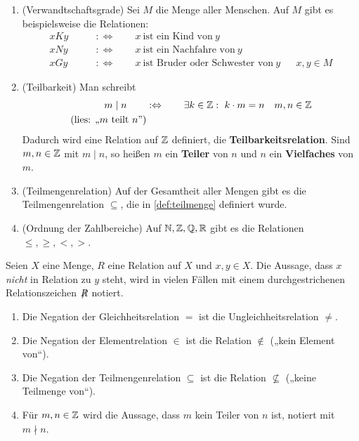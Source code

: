 \begin{bsp} \label{bsp:relation}   \quad
    \begin{enumerate}
        \item(Verwandtschaftsgrade) Sei $M$ die Menge aller Menschen. Auf $M$ gibt es beispielsweise die Relationen:
        \begin{align*}
            xKy \qquad&:\Leftrightarrow\qquad x\ \text{ist ein Kind von}\ y && \\
            xNy \qquad&:\Leftrightarrow\qquad x\ \text{ist ein Nachfahre von}\ y && \\
            xGy \qquad&:\Leftrightarrow\qquad x\ \text{ist Bruder oder Schwester von}\ y && x,y\in M
        \end{align*}
        \item(Teilbarkeit) Man schreibt
        \begin{align*}
            m \mid n \qquad& :\Leftrightarrow\qquad \exists k\in \mathbb Z:\ k\cdot m=n && m,n\in \mathbb Z \\
            (\text{lies: „$m$ teilt $n$”})
        \end{align*}
        Dadurch wird eine Relation auf $\mathbb Z$ definiert, die \textbf{Teilbarkeitsrelation}. Sind $m,n\in \mathbb Z$ mit $m\mid n$, so heißen $m$ ein \textbf{Teiler} von $n$ und $n$ ein \textbf{Vielfaches} von $m$.
        \item(Teilmengenrelation) Auf der Gesamtheit aller Mengen gibt es die Teilmengenrelation $\subseteq$, die in \cref{def:teilmenge} definiert wurde.
        \item(Ordnung der Zahlbereiche) Auf $\mathbb N,\mathbb Z,\mathbb Q,\mathbb R$ gibt es die Relationen $\le, \ge, <, >$.
    \end{enumerate}
\end{bsp}


\begin{nota}
    Seien $X$ eine Menge, $R$ eine Relation auf $X$ und $x,y\in X$. Die Aussage, dass $x$ \emph{nicht} in Relation zu $y$ steht, wird in vielen Fällen mit einem durchgestrichenen Relationszeichen $\not\mathrel{R}$ notiert.
\end{nota}


\begin{bsp} \quad
    \begin{enumerate}
        \item Die Negation der Gleichheitsrelation $=$ ist die Ungleichheitsrelation $\neq$.
        \item Die Negation der Elementrelation $\in$ ist die Relation $\notin$ („kein Element von“).
        \item Die Negation der Teilmengenrelation $\subseteq$ ist die Relation $\nsubseteq$ („keine Teilmenge von“).
        \item Für $m,n\in \mathbb Z$ wird die Aussage, dass $m$ kein Teiler von $n$ ist, notiert mit $m\nmid n$.
    \end{enumerate}
\end{bsp}


